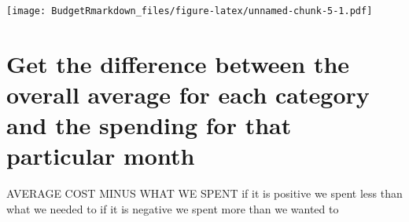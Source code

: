 \documentclass[
]{article}
\newenvironment{Shaded}{\begin{snugshade}}{\end{snugshade}}
\newcommand{\CommentTok}[1]{\textcolor[rgb]{0.56,0.35,0.01}{\textit{#1}}}
\newcommand{\DecValTok}[1]{\textcolor[rgb]{0.00,0.00,0.81}{#1}}
\newcommand{\KeywordTok}[1]{\textcolor[rgb]{0.13,0.29,0.53}{\textbf{#1}}}
\newcommand{\NormalTok}[1]{#1}
\newcommand{\OperatorTok}[1]{\textcolor[rgb]{0.81,0.36,0.00}{\textbf{#1}}}
\newcommand{\StringTok}[1]{\textcolor[rgb]{0.31,0.60,0.02}{#1}}
\begin{document}
\texttt{[image: BudgetRmarkdown\_files/figure-latex/unnamed-chunk-5-1.pdf]}

\hypertarget{get-the-difference-between-the-overall-average-for-each-category-and-the-spending-for-that-particular-month}{%
\section{Get the difference between the overall average for each
category and the spending for that particular
month}\label{get-the-difference-between-the-overall-average-for-each-category-and-the-spending-for-that-particular-month}}

AVERAGE COST MINUS WHAT WE SPENT if it is positive we spent less than
what we needed to if it is negative we spent more than we wanted to

\begin{Shaded}
\end{Shaded}
\end{document}
